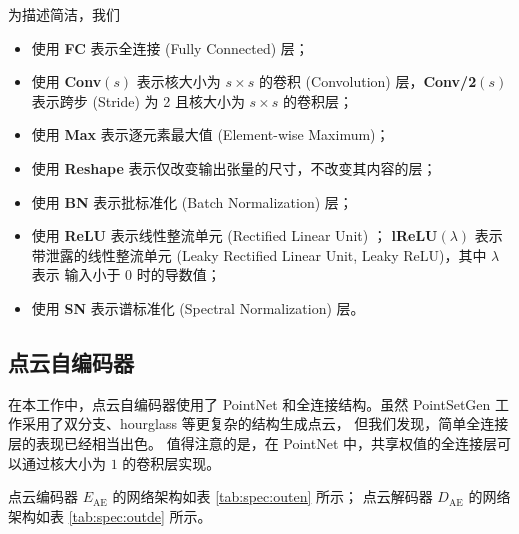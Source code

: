 为描述简洁，我们
\begin{itemize}
	\item 使用 \textbf{FC}   表示全连接 (Fully Connected) 层；
	\item 使用 \textbf{Conv$(s)$} 表示核大小为 $s \times s$ 的卷积 (Convolution) 层，\textbf{Conv/2$(s)$} 表示跨步 (Stride) 为 2 且核大小为 $s \times s$ 的卷积层；
	\item 使用 \textbf{Max}  表示逐元素最大值 (Element-wise Maximum)；
	\item 使用 \textbf{Reshape}  表示仅改变输出张量的尺寸，不改变其内容的层；
	\item 使用 \textbf{BN}   表示批标准化 (Batch Normalization) \cite{bn} 层；
	\item 使用 \textbf{ReLU} 表示线性整流单元 (Rectified Linear Unit) \cite{relu}；
	      \textbf{lReLU$(\lambda)$} 表示带泄露的线性整流单元 (Leaky Rectified Linear Unit, Leaky ReLU)\cite{lrelu}，其中 $\lambda$ 表示 输入小于 0 时的导数值；
	\item 使用 \textbf{SN}   表示谱标准化 (Spectral Normalization) \cite{sngan} 层。
\end{itemize}

\subsection{点云自编码器}
在本工作中，点云自编码器使用了 PointNet\cite{pointnet} 和全连接结构。虽然 PointSetGen\cite{pointsetgen} 工作采用了双分支、hourglass 等更复杂的结构生成点云，
但我们发现，简单全连接层的表现已经相当出色。
值得注意的是，在 PointNet 中，共享权值的全连接层可以通过核大小为 $1$ 的卷积层实现。

点云编码器 $E_{\text{AE}}$ 的网络架构如表 \ref{tab:spec:outen} 所示；
点云解码器 $D_{\text{AE}}$ 的网络架构如表 \ref{tab:spec:outde} 所示。


